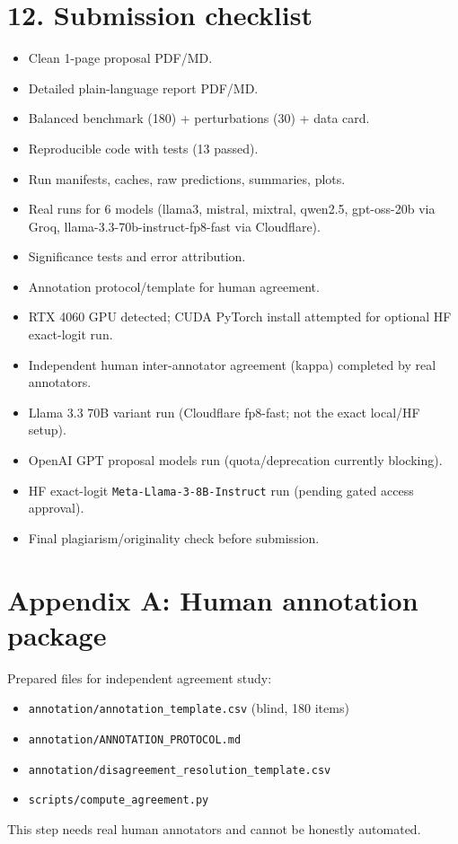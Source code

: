 \documentclass[11pt, a4paper]{article}
\begin{document}
\section*{\color{bambergnavy} 12. Submission checklist}
\begin{itemize}[leftmargin=*]
    \item[$\boxtimes$] Clean 1-page proposal PDF/MD.
    \item[$\boxtimes$] Detailed plain-language report PDF/MD.
    \item[$\boxtimes$] Balanced benchmark (180) + perturbations (30) + data card.
    \item[$\boxtimes$] Reproducible code with tests (13 passed).
    \item[$\boxtimes$] Run manifests, caches, raw predictions, summaries, plots.
    \item[$\boxtimes$] Real runs for 6 models (llama3, mistral, mixtral, qwen2.5, gpt-oss-20b via Groq, llama-3.3-70b-instruct-fp8-fast via Cloudflare).
    \item[$\boxtimes$] Significance tests and error attribution.
    \item[$\boxtimes$] Annotation protocol/template for human agreement.
    \item[$\boxtimes$] RTX 4060 GPU detected; CUDA PyTorch install attempted for optional HF exact-logit run.
    \item[$\square$] Independent human inter-annotator agreement (kappa) completed by real annotators.
    \item[$\boxtimes$] Llama 3.3 70B variant run (Cloudflare fp8-fast; not the exact local/HF setup).
    \item[$\square$] OpenAI GPT proposal models run (quota/deprecation currently blocking).
    \item[$\square$] HF exact-logit \texttt{Meta-Llama-3-8B-Instruct} run (pending gated access approval).
    \item[$\square$] Final plagiarism/originality check before submission.
\end{itemize}

\FloatBarrier
{}
\section*{\color{bambergnavy} Appendix A: Human annotation package}
Prepared files for independent agreement study:
\begin{itemize}[leftmargin=*]
    \item \texttt{annotation/annotation\_template.csv} (blind, 180 items)
    \item \texttt{annotation/ANNOTATION\_PROTOCOL.md}
    \item \texttt{annotation/disagreement\_resolution\_template.csv}
    \item \texttt{scripts/compute\_agreement.py}
\end{itemize}
This step needs real human annotators and cannot be honestly automated.
\end{document}
